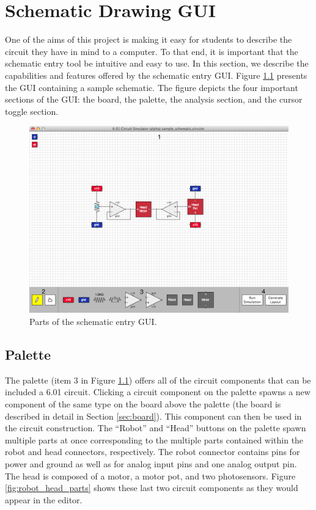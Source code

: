 
\chapter{Schematic Drawing GUI}
\label{app:gui}

One of the aims of this project is making it easy for students to describe the
circuit they have in mind to a computer. To that end, it is important that the
schematic entry tool be intuitive and easy to use. In this section, we
describe the capabilities and features offered by the schematic entry GUI.
Figure \ref{fig:gui} presents the GUI containing a sample
schematic. The figure depicts the four important sections of the GUI: the board,
the palette, the analysis section, and the cursor toggle section.

\begin{figure}
\begin{center}
\includegraphics[width=\textwidth]{Images/gui.png}
\caption{Parts of the schematic entry GUI.}
\label{fig:gui}
\end{center}
\end{figure}

\section{Palette}

The palette (item $3$ in Figure \ref{fig:gui}) offers all of the circuit
components that can be included a 6.01 circuit. Clicking a circuit component on
the palette spawns a new component of the same type on the board above
the palette (the board is described in detail in Section \ref{sec:board}).
This component can then be used in the circuit construction. The
``Robot'' and ``Head'' buttons on the palette spawn multiple parts at once
corresponding to the multiple parts contained within the robot and head
connectors, respectively. The robot
connector contains pins for power and ground as well as for analog input pins
and one analog output pin. The head is composed of a motor, a motor pot, and
two photosensors. Figure \ref{fig:robot_head_parts} shows these last two
circuit components as they would appear in the editor.

